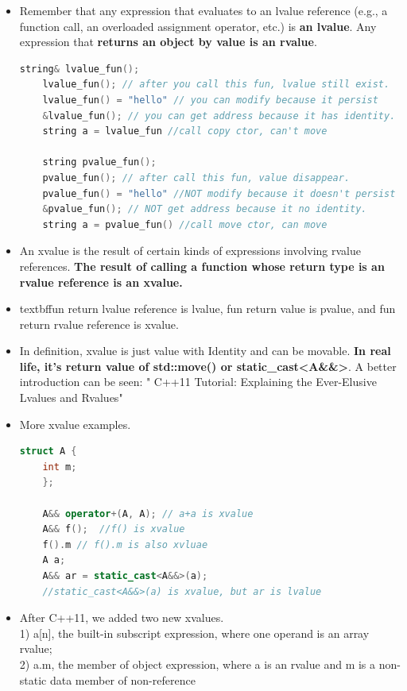 \documentclass[a4paper,12pt,twoside]{book}
\begin{document}
\begin{itemize}
	\item Remember that any expression that evaluates to an lvalue reference (e.g., a function call, an overloaded assignment operator, etc.) is \textbf{an lvalue}. Any expression that \textbf{returns an object by value is an rvalue}.
	
	\begin{lstlisting}[frame=single, language=c++, mathescape=true]
	string& lvalue_fun();
	lvalue_fun(); // after you call this fun, lvalue still exist.
	lvalue_fun() = "hello" // you can modify because it persist
	&lvalue_fun(); // you can get address because it has identity.
	string a = lvalue_fun //call copy ctor, can't move
	
	string pvalue_fun();
	pvalue_fun(); // after call this fun, value disappear.
	pvalue_fun() = "hello" //NOT modify because it doesn't persist
	&pvalue_fun(); // NOT get address because it no identity.
	string a = pvalue_fun() //call move ctor, can move
	\end{lstlisting}
	
	\item An xvalue is the result of certain kinds of expressions involving rvalue references. \textbf{The result of calling a function whose return type is an rvalue reference is an xvalue.}
	
	\item textbf{fun return lvalue reference is lvalue, fun return value is pvalue, and fun return rvalue reference is xvalue.}
	
	\item In definition,  xvalue is just value with Identity and can be movable. \textbf{In real life, it's  return value of std::move() or static\_cast<A\&\&>}. A better introduction can be seen: " C++11 Tutorial: Explaining the Ever-Elusive Lvalues and Rvalues"
	
	\item More xvalue examples.
	\begin{lstlisting}[frame=single, language=c++, mathescape=true]
	struct A {
	int m;
	};
	
	A&& operator+(A, A); // a+a is xvalue
	A&& f();  //f() is xvalue
	f().m // f().m is also xvluae
	A a;
	A&& ar = static_cast<A&&>(a);
	//static_cast<A&&>(a) is xvalue, but ar is lvalue
	\end{lstlisting}
	
	\item After C++11, we added two new xvalues.\\
	1) a[n], the built-in subscript expression, where one operand is an array rvalue;\\
	2) a.m, the member of object expression, where a is an rvalue and m is a non-static data member of non-reference
\end{itemize}
\end{document}
